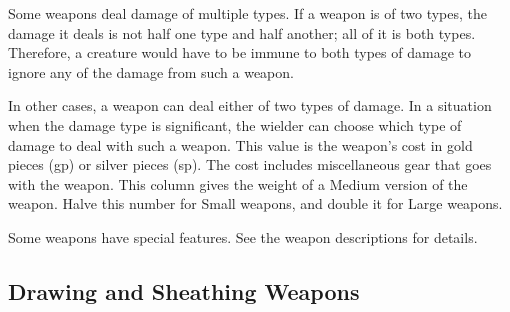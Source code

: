 Some weapons deal damage of multiple types. If a weapon is of two types, the damage it deals is not half one type and half another; all of it is both types. Therefore, a creature would have to be immune to both types of damage to ignore any of the damage from such a weapon.

In other cases, a weapon can deal either of two types of damage. In a situation when the damage type is significant, the wielder can choose which type of damage to deal with such a weapon.
 This value is the weapon's cost in gold pieces (gp) or silver pieces (sp). The cost includes miscellaneous gear that goes with the weapon.
 This column gives the weight of a Medium version of
the weapon. Halve this number for Small weapons, and double it for
Large weapons.

 Some weapons have special features. See the weapon
descriptions for details.

\subsection{Drawing and Sheathing Weapons}


